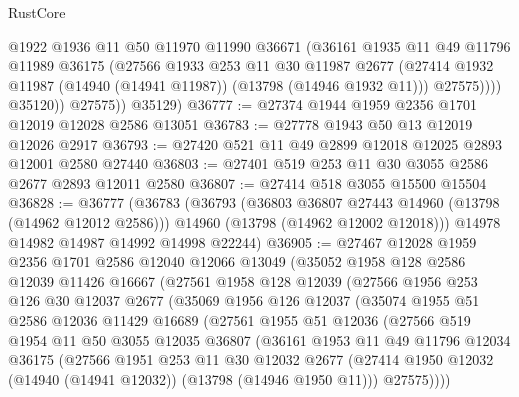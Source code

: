 \begin{lexlean}{RustCore}
\begin{coremodule}
                  @1922
                  @1936
                  @11
                  @50
                  @11970
                  @11990
                  @36671
                  (@36161
                    @1935
                    @11
                    @49
                    @11796
                    @11989
                    @36175
                    (@27566
                      @1933
                      @253
                      @11
                      @30
                      @11987
                      @2677
                      (@27414 @1932 @11987 (@14940 (@14941 @11987)) (@13798 (@14946 @1932 @11)))
                      @27575))))
              @35120))
          @27575))
      @35129)
@36777 := @27374 @1944 @1959 @2356 @1701 @12019 @12028 @2586 @13051
@36783 := @27778 @1943 @50 @13 @12019 @12026 @2917
@36793 := @27420 @521 @11 @49 @2899 @12018 @12025 @2893 @12001 @2580 @27440
@36803 := @27401 @519 @253 @11 @30 @3055 @2586 @2677 @2893 @12011 @2580
@36807 := @27414 @518 @3055 @15500 @15504
@36828 := @36777
    (@36783
      (@36793
        (@36803 @36807 @27443 @14960 (@13798 (@14962 @12012 @2586)))
        @14960
        (@13798 (@14962 @12002 @12018)))
      @14978
      @14982
      @14987
      @14992
      @14998
      @22244)
@36905 := @27467
    @12028
    @1959
    @2356
    @1701
    @2586
    @12040
    @12066
    @13049
    (@35052
      @1958
      @128
      @2586
      @12039
      @11426
      @16667
      (@27561
        @1958
        @128
        @12039
        (@27566
          @1956
          @253
          @126
          @30
          @12037
          @2677
          (@35069
            @1956
            @126
            @12037
            (@35074
              @1955
              @51
              @2586
              @12036
              @11429
              @16689
              (@27561
                @1955
                @51
                @12036
                (@27566
                  @519
                  @1954
                  @11
                  @50
                  @3055
                  @12035
                  @36807
                  (@36161
                    @1953
                    @11
                    @49
                    @11796
                    @12034
                    @36175
                    (@27566
                      @1951
                      @253
                      @11
                      @30
                      @12032
                      @2677
                      (@27414 @1950 @12032 (@14940 (@14941 @12032)) (@13798 (@14946 @1950 @11)))
                      @27575))))

\end{coremodule}
\end{lexlean}
